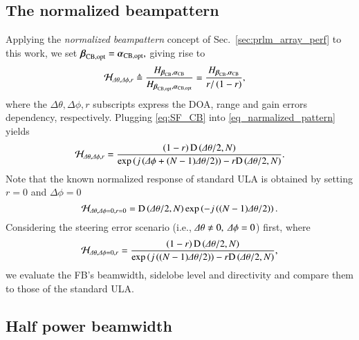 \subsection{The normalized beampattern}
\label{subsection_spatialIIR_normBP}
Applying the \emph{normalized beampattern} concept of Sec.~\ref{sec:prlm_array_perf} to this work, we set $\boldsymbol{\beta}_{\text{CB},\text{opt}}=\boldsymbol{\alpha}_{\text{CB},\text{opt}},$ giving rise to
\begin{equation}
    \label{eq_narmalized_pattern}
    \begin{split}
        \mathcal{H}_{\Delta\theta,\Delta\phi,r}&\triangleq
        \frac{
        H_{\boldsymbol{\beta}_{\text{CB}},\boldsymbol{\alpha}_{\text{CB}}}
        }{
        H_{\boldsymbol{\beta}_{\text{CB},\text{opt}},\boldsymbol{\alpha}_{\text{CB},\text{opt}}}
        }
         =
        \frac{
        H_{\boldsymbol{\beta}_{\text{CB}},\boldsymbol{\alpha}_{\text{CB}}}
        }{
        r/\left({1-r}\right)
        },
    \end{split}
\end{equation}
where the $\Delta\theta,\Delta\phi,r$ subscripts express the DOA, range and gain errors dependency, respectively.
Plugging \eqref{eq:SF_CB} into \eqref{eq_narmalized_pattern} yields 
\begin{equation}\label{eq_generalH}
    {
        \begin{split}
             \mathcal{H}_{\Delta\theta,\Delta\phi,r}=
             \frac{\left({1-r}\right)\text{D}\left({\Delta\theta/2,N}\right)}{\exp\left({j\left({\Delta\phi+(N-1)\Delta\theta/2}\right)}\right)-r\text{D}\left({\Delta\theta/2,N}\right)}.
        \end{split}
        }
\end{equation}
Note that the known \cite{van2004optimum} normalized response of standard ULA is obtained by setting $r=0$ and $\Delta\phi=0$
$$
\mathcal{H}_{\Delta\theta,\Delta\phi=0,r=0}=
             \text{D}\left({\Delta\theta/2,N}\right)\exp\left({-j\left({(N-1)\Delta\theta/2}\right)}\right).
$$
Considering the steering error scenario (i.e., $\Delta\theta\neq0,\ \Delta\phi=0$) first, where 
\begin{equation}\label{eq_Hdphi0}
\mathcal{H}_{\Delta\theta,\Delta\phi=0,r}=
             \frac{\left({1-r}\right)\text{D}\left({\Delta\theta/2,N}\right)}{\exp\left({j\left({(N-1)\Delta\theta/2}\right)}\right)-r\text{D}\left({\Delta\theta/2,N}\right)},
\end{equation}
we evaluate the FB's beamwidth, sidelobe level and directivity and compare them to those of the standard ULA.
\subsection{Half power beamwidth}


